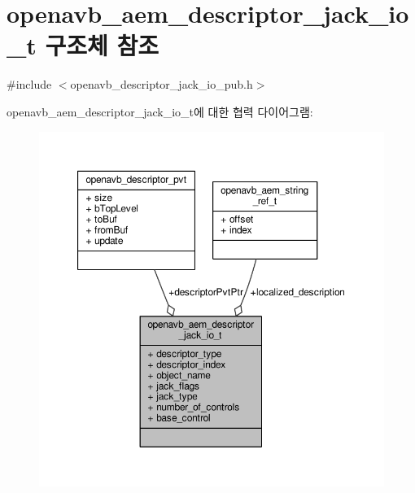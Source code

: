 \hypertarget{structopenavb__aem__descriptor__jack__io__t}{}\section{openavb\+\_\+aem\+\_\+descriptor\+\_\+jack\+\_\+io\+\_\+t 구조체 참조}
\label{structopenavb__aem__descriptor__jack__io__t}


{\ttfamily \#include $<$openavb\+\_\+descriptor\+\_\+jack\+\_\+io\+\_\+pub.\+h$>$}



openavb\+\_\+aem\+\_\+descriptor\+\_\+jack\+\_\+io\+\_\+t에 대한 협력 다이어그램\+:
\nopagebreak
\begin{figure}[H]
\begin{center}
\leavevmode
\includegraphics[width=350pt]{structopenavb__aem__descriptor__jack__io__t__coll__graph}
\end{center}
\end{figure}
